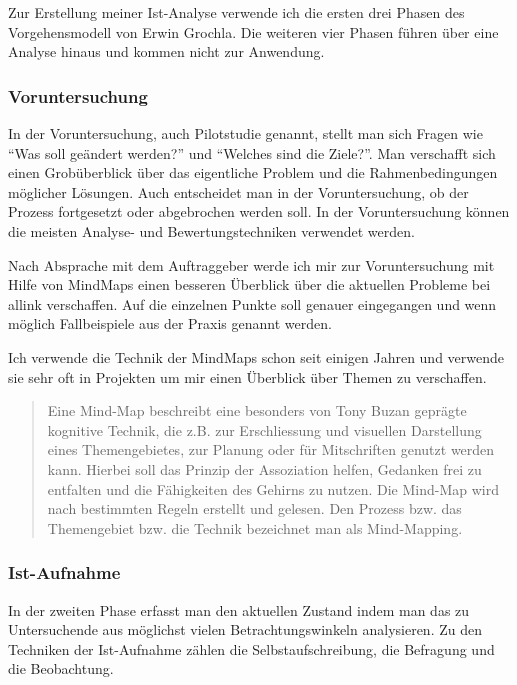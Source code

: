 Zur Erstellung meiner Ist-Analyse verwende ich die ersten drei Phasen des 
Vorgehensmodell von Erwin Grochla\cite[S. 44-74]{grochla1982grundlagen}.
Die weiteren vier Phasen führen über eine Analyse hinaus und kommen
nicht zur Anwendung.

\subsubsection{Voruntersuchung}
In der Voruntersuchung, auch Pilotstudie genannt, stellt man sich Fragen wie
``Was soll geändert werden?'' und ``Welches sind die Ziele?''. Man verschafft
sich einen Grobüberblick über das eigentliche Problem und die Rahmenbedingungen
möglicher Lösungen. Auch entscheidet man in der Voruntersuchung, ob der Prozess
fortgesetzt oder abgebrochen werden soll. In der Voruntersuchung können die 
meisten Analyse- und Bewertungstechniken verwendet werden.

Nach Absprache mit dem Auftraggeber werde ich mir zur Voruntersuchung mit  
Hilfe von MindMaps einen besseren Überblick über die aktuellen Probleme bei
allink verschaffen. Auf die einzelnen Punkte soll genauer eingegangen
und wenn möglich Fallbeispiele aus der Praxis genannt werden.

Ich verwende die Technik der MindMaps schon seit einigen Jahren und verwende
sie sehr oft in Projekten um mir einen Überblick über Themen zu verschaffen.

\begin{quote}
Eine Mind-Map beschreibt eine besonders von Tony Buzan geprägte kognitive 
Technik, die z.B. zur Erschliessung und visuellen Darstellung eines Themengebietes, 
zur Planung oder für Mitschriften genutzt werden kann. Hierbei soll das Prinzip 
der Assoziation helfen, Gedanken frei zu entfalten und die Fähigkeiten des Gehirns 
zu nutzen. Die Mind-Map wird nach bestimmten Regeln erstellt und gelesen. Den 
Prozess bzw. das Themengebiet bzw. die Technik bezeichnet man als Mind-Mapping.
\cite{wikipedia_mindmap}
\end{quote}

\subsubsection{Ist-Aufnahme}
In der zweiten Phase erfasst man den aktuellen Zustand indem man das zu 
Untersuchende aus möglichst vielen Betrachtungswinkeln analysieren. Zu den
Techniken der Ist-Aufnahme zählen die Selbstaufschreibung, die Befragung und 
die Beobachtung.

